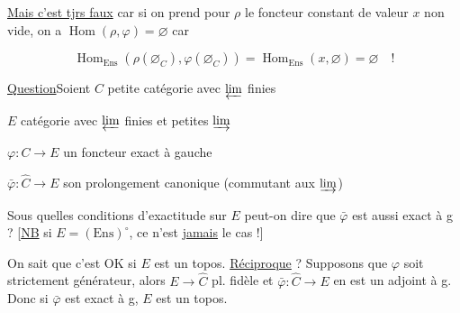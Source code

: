 \diagram{\begin{tikzcd}[ampersand replacement=\&]\varphi\arrow[r]\arrow[dr,equal]\&\varphi\amalg\psi\arrow[d,dashed]\\\&\varphi\end{tikzcd}}

 \uline{Mais c'est tjrs faux}  car si on prend pour $\rho$ le foncteur constant de valeur $x$ non vide, on a $\operatorname{Hom}(\rho,\varphi)=\varnothing$ car

\[\operatorname{Hom}_{\mathrm{Ens}}(\rho(\varnothing_C),\varphi(\varnothing_C))=\operatorname{Hom}_{\mathrm{Ens}}(x,\varnothing)=\varnothing\quad !\]

\uline{Question}\qquad Soient $C$ petite catégorie avec $\varprojlim$ finies

$E$ catégorie avec $\varprojlim$ finies et petites $\varinjlim$

$\varphi:C\to E$ un foncteur exact à gauche

$\bar\varphi:\hat C\to E$ son prolongement canonique (commutant aux  $\varinjlim$)

Sous quelles conditions d'exactitude sur $E$ peut-on dire que $\bar\varphi$ est aussi exact à g ? [\uline{NB} si $E=(\mathrm{Ens})^\circ$, ce n'est \uline{jamais} le cas !]

On sait que c'est OK si $E$ est un topos. \uline{Réciproque} ? Supposons que $\varphi$ soit strictement générateur,  alors $E\to\hat C$ pl.  fidèle et $\bar\varphi:\hat C\to E$ en est un adjoint à g. Donc si $\bar\varphi$ est exact à g, $E$ est un topos.


